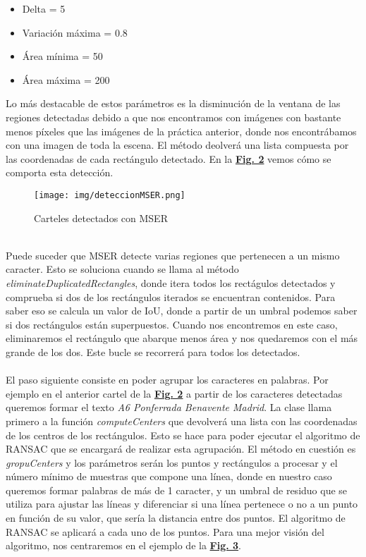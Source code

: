 \documentclass[a4paper, 12pt]{article}
\begin{document}
\begin{itemize}
    \item Delta = 5
    \item Variación máxima = 0.8
    \item Área mínima = 50
    \item Área máxima = 200
\end{itemize}
Lo más destacable de estos parámetros es la disminución de la ventana de las regiones detectadas debido a que nos encontramos con imágenes con bastante menos píxeles que las imágenes de la práctica anterior, donde nos encontrábamos con una imagen de toda la escena. El método deolverá una lista compuesta por las coordenadas de cada rectángulo detectado. En la \textbf{\hyperref[fig:normalizacion]{Fig. 2}} vemos cómo se comporta esta detección. 
\begin{figure}[h]
	\centering
	\texttt{[image: img/deteccionMSER.png]}
 	\caption{Carteles detectados con MSER}\vspace{0.5cm}
	\label{fig:normalizacion}
\end{figure}
\\Puede suceder que MSER detecte varias regiones que pertenecen a un mismo caracter. Esto se soluciona cuando se llama al método \textit{eliminateDuplicatedRectangles}, donde itera todos los rectágulos detectados y comprueba si dos de los rectángulos iterados se encuentran contenidos. Para saber eso se calcula un valor de IoU, donde a partir de un umbral podemos saber si dos rectángulos están superpuestos. Cuando nos encontremos en este caso, eliminaremos el rectángulo que abarque menos área y nos quedaremos con el más grande de los dos. Este bucle se recorrerá para todos los detectados.
\\\\
El paso siguiente consiste en poder agrupar los caracteres en palabras. Por ejemplo en el anterior cartel de la \textbf{\hyperref[fig:normalizacion]{Fig. 2}} a partir de los caracteres detectadas queremos formar el texto \textit{A6 Ponferrada Benavente Madrid}. La clase llama primero a la función \textit{computeCenters} que devolverá una lista con las coordenadas de los centros de los rectángulos. Esto se hace para poder ejecutar el algoritmo de RANSAC que se encargará de realizar esta agrupación. El método en cuestión es \textit{gropuCenters} y los parámetros serán los puntos y rectángulos a procesar y el número mínimo de muestras que compone una línea, donde en nuestro caso queremos formar palabras de más de 1 caracter, y un umbral de residuo que se utiliza para ajustar las líneas y diferenciar si una línea pertenece o no a un punto en función de su valor, que sería la distancia entre dos puntos. El algoritmo de RANSAC se aplicará a cada uno de los puntos. Para una mejor visión del algoritmo, nos centraremos en el ejemplo de la \textbf{\hyperref[fig:normalizacion]{Fig. 3}}.
\end{document}
